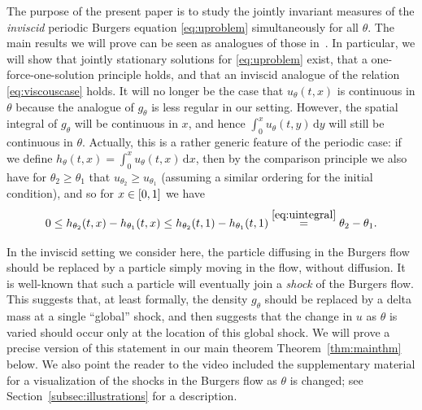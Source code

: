 \documentclass[AHL,Unicode,longabstracts]{cedram}
\newcounter{setofcase}
\newcounter{case}[setofcase]
\newcommand*\dif{\mathrm{d}}
\let\oldin\in
\renewcommand{\in}{\mathchoice{\oldin}{\oldin}{\,\oldin\,}{\,\oldin\,}}
\begin{document}
The purpose of the present paper is to study the jointly invariant measures of the \emph{inviscid} periodic Burgers equation \eqref{eq:uproblem} simultaneously for all $\theta$. The main results we will prove can be seen as analogues of those in~\cite{DG23}. In particular, we will show that jointly stationary solutions for \eqref{eq:uproblem} exist, that a one-force-one-solution principle holds, and that an inviscid analogue of the relation \eqref{eq:viscouscase} holds. It will no longer be the case that $u_{\theta}(t,x)$ is continuous in $\theta$ because the analogue of $g_{\theta}$ is less regular in our setting. However, the spatial integral of $g_{\theta}$ will be continuous in $x$, and hence $\int_{0}^{x}u_{\theta}(t,y)\,\dif y$ will still be continuous in $\theta$. Actually, this is a rather generic feature of the periodic case: if we define $h_{\theta}(t,x)=\int_{0}^{x}u_{\theta}(t,x)\,\dif x$, then by the comparison principle we also have for $\theta_{2}\ge\theta_{1}$ that $u_{\theta_{2}}\ge u_{\theta_{1}}$ (assuming a similar ordering for the initial condition), and so for $x\in[0,1]$ we have
\begin{equation}\label{eq:hsqueeze}
0\le h_{\theta_{2}}(t,x)-h_{\theta_{1}}(t,x)\le h_{\theta_{2}}(t,1)-h_{\theta_{1}}(t,1)\overset{\eqref{eq:uintegral}}{=}\theta_{2}-\theta_{1}.
\end{equation}

In the inviscid setting we consider here, the particle diffusing in the Burgers flow should be replaced by a particle simply moving in the flow, without diffusion. It is well-known that such a particle will eventually join a \emph{shock }of the Burgers flow. This suggests that, at least formally, the density $g_{\theta}$ should be replaced by a delta mass at a single ``global'' shock, and  then suggests that the change in $u$ as $\theta$ is varied should occur only at the location of this global shock. We will prove a precise version of this statement in our main theorem Theorem~\ref{thm:mainthm} below. We also point the reader to the video included the supplementary material for a visualization of the shocks in the Burgers flow as $\theta$ is changed; see Section~\ref{subsec:illustrations} for a description.
\end{document}
